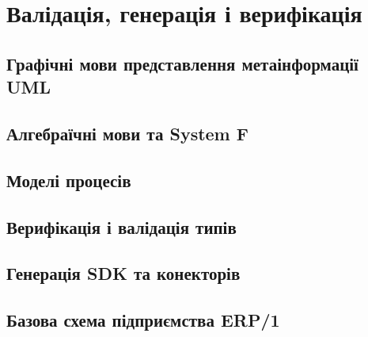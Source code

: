 \chapter{Валідація, генерація і верифікація}

\section{Графічні мови представлення метаінформації UML}

\section{Алгебраїчні мови та System F}

\section{Моделі процесів}

\section{Верифікація і валідація типів}

\section{Генерація SDK та конекторів}

\section{Базова схема підприємства ERP/1}

